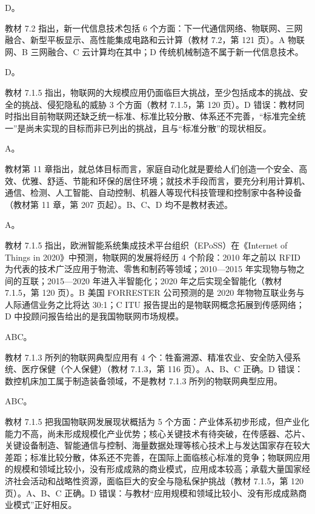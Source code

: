 \documentclass[a4paper,11pt]{article}
\begin{document}
\q D。\begin{analysis}教材 7.2 指出，新一代信息技术包括 6 个方面：下一代通信网络、物联网、三网融合、新型平板显示、高性能集成电路和云计算（教材 7.2，第 121 页）。A 物联网、B 三网融合、C 云计算均在其中；D 传统机械制造不属于新一代信息技术。\end{analysis}

\q D。\begin{analysis}教材 7.1.5 指出，物联网的大规模应用仍面临巨大挑战，至少包括成本的挑战、安全的挑战、侵犯隐私的威胁 3 个方面（教材 7.1.5，第 120 页）。D 错误：教材同时指出目前物联网还缺乏统一标准、标准比较分散、体系还不完善，“标准完全统一”是尚未实现的目标而非已列出的挑战，且与“标准分散”的现状相反。\end{analysis}

\q A。\begin{analysis}教材第 11 章指出，就总体目标而言，家庭自动化就是要给人们创造一个安全、高效、优雅、舒适、节能和环保的居住环境；就技术手段而言，要充分利用计算机、通信、检测、人工智能、自动控制、机器人等现代科技管理和控制家中各种设备（教材第 11 章，第 207 页起）。B、C、D 均不是教材表述。\end{analysis}

\q A。\begin{analysis}教材 7.1.5 指出，欧洲智能系统集成技术平台组织（EPoSS）在《Internet of Things in 2020》中预测，物联网的发展将经历 4 个阶段：2010 年之前以 RFID 为代表的技术广泛应用于物流、零售和制药等领域；2010—2015 年实现物与物之间的互联；2015—2020 年进入半智能化；2020 年之后实现全智能化（教材 7.1.5，第 120 页）。B 美国 FORRESTER 公司预测的是 2020 年物物互联业务与人际通信业务之比将达 30:1；C ITU 报告提出的是物联网概念拓展到传感网络；D 中投顾问报告给出的是我国物联网市场规模。\end{analysis}


\q ABC。\begin{analysis}教材 7.1.3 所列的物联网典型应用有 4 个：牲畜溯源、精准农业、安全防入侵系统、医疗保健（个人保健）（教材 7.1.3，第 116 页）。A、B、C 正确。D 错误：数控机床加工属于制造装备领域，不是教材 7.1.3 所列的物联网典型应用。\end{analysis}

\q ABC。\begin{analysis}教材 7.1.5 把我国物联网发展现状概括为 5 个方面：产业体系初步形成，但产业化能力不高，尚未形成规模化产业优势；核心关键技术有待突破，在传感器、芯片、关键设备制造、智能通信与控制、海量数据处理等核心技术上与发达国家存在较大差距；标准比较分散，体系还不完善，在国际上面临核心标准的竞争；物联网应用的规模和领域比较小，没有形成成熟的商业模式，应用成本较高；承载大量国家经济社会活动和战略性资源，面临巨大的安全与隐私保护挑战（教材 7.1.5，第 120 页）。A、B、C 正确。D 错误：与教材“应用规模和领域比较小、没有形成成熟商业模式”正好相反。\end{analysis}
\end{document}
